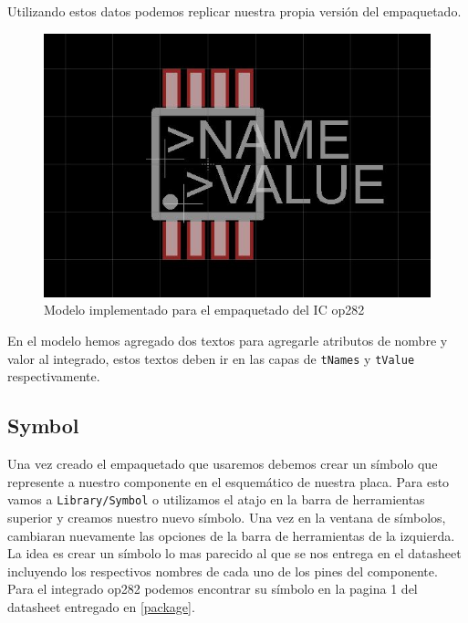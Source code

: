 \documentclass[11pt,letterpaper,spanish]{article}
\begin{document}
Utilizando estos datos podemos replicar nuestra propia versión del empaquetado.

\begin{figure}[!h]
\begin{center}
\includegraphics[scale=0.4]{figuras/4.JPG}
\end{center}
\caption{Modelo implementado para el empaquetado del IC op282}
\end{figure}


En el modelo hemos agregado dos textos para agregarle atributos de nombre y valor al integrado, estos textos deben ir en las capas de \verb+tNames+ y \verb+tValue+ respectivamente.


\subsection{Symbol}
Una vez creado el empaquetado que usaremos debemos crear un símbolo que represente a nuestro componente en el esquemático de nuestra placa. Para esto vamos a \verb+Library/Symbol+ o utilizamos el atajo en la barra de herramientas superior y creamos nuestro nuevo símbolo. Una vez en la ventana de símbolos, cambiaran nuevamente las opciones de la barra de herramientas de la izquierda. La idea es crear un símbolo lo mas parecido al que se nos entrega en el datasheet incluyendo los respectivos nombres de cada uno de los pines del componente. Para el integrado op282 podemos encontrar su símbolo en la pagina 1 del datasheet entregado en  \ref{package}.
\end{document}

